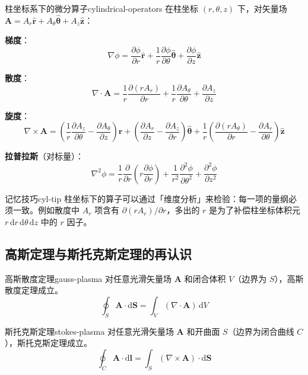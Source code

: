 \documentclass[12pt,a4paper,openany,oneside]{book}
\newcommand{\diff}{\mathrm{d}}
\newcommand{\vect}[1]{\bm{#1}}
\newcommand{\unitvec}[1]{\hat{\vect{#1}}}
\newcommand{\grad}{\nabla}
\newcommand{\curl}{\nabla\times}
\newcommand{\divg}{\nabla\cdot}
\newcommand{\lap}{\nabla^2}
\begin{document}
\begin{theorem}{柱坐标系下的微分算子}{cylindrical-operators}
在柱坐标 $(r,\theta,z)$ 下，对矢量场 $\vect{A} = A_r\unitvec{r} + A_\theta\unitvec{\theta} + A_z\unitvec{z}$：

\textbf{梯度}：
\[
\grad\phi = \frac{\partial\phi}{\partial r}\unitvec{r} + \frac{1}{r}\frac{\partial\phi}{\partial\theta}\unitvec{\theta} + \frac{\partial\phi}{\partial z}\unitvec{z}
\]

\textbf{散度}：
\[
\divg\vect{A} = \frac{1}{r}\frac{\partial(rA_r)}{\partial r} + \frac{1}{r}\frac{\partial A_\theta}{\partial\theta} + \frac{\partial A_z}{\partial z}
\]

\textbf{旋度}：
\[
\curl\vect{A} = \left(\frac{1}{r}\frac{\partial A_z}{\partial\theta} - \frac{\partial A_\theta}{\partial z}\right)\unitvec{r} + \left(\frac{\partial A_r}{\partial z} - \frac{\partial A_z}{\partial r}\right)\unitvec{\theta} + \frac{1}{r}\left(\frac{\partial(rA_\theta)}{\partial r} - \frac{\partial A_r}{\partial\theta}\right)\unitvec{z}
\]

\textbf{拉普拉斯}（对标量）：
\[
\lap\phi = \frac{1}{r}\frac{\partial}{\partial r}\left(r\frac{\partial\phi}{\partial r}\right) + \frac{1}{r^2}\frac{\partial^2\phi}{\partial\theta^2} + \frac{\partial^2\phi}{\partial z^2}
\]
\end{theorem}

\begin{tip}{记忆技巧}{cyl-tip}
柱坐标下的算子可以通过「维度分析」来检验：每一项的量纲必须一致。例如散度中 $A_r$ 项含有 $\partial(rA_r)/\partial r$，多出的 $r$ 是为了补偿柱坐标体积元 $r\,\diff r\,\diff\theta\,\diff z$ 中的 $r$ 因子。
\end{tip}

\subsection{高斯定理与斯托克斯定理的再认识}

\begin{theorem}{高斯散度定理}{gauss-plasma}
对任意光滑矢量场 $\vect{A}$ 和闭合体积 $V$（边界为 $S$），高斯散度定理成立。
\[
\oint_S \vect{A}\cdot\diff\vect{S} = \int_V (\divg\vect{A})\,\diff V
\]
\end{theorem}

\begin{theorem}{斯托克斯定理}{stokes-plasma}
对任意光滑矢量场 $\vect{A}$ 和开曲面 $S$（边界为闭合曲线 $C$），斯托克斯定理成立。
\[
\oint_C \vect{A}\cdot\diff\vect{l} = \int_S (\curl\vect{A})\cdot\diff\vect{S}
\]
\end{theorem}
\end{document}

